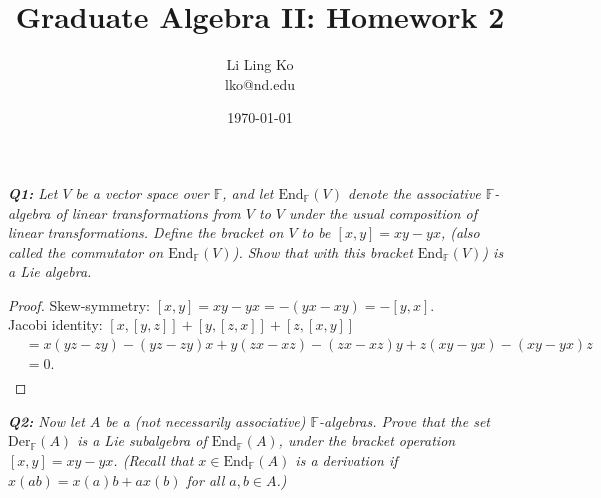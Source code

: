 \documentclass{article}
\begin{document}
\title{Graduate Algebra II: Homework 2}
\author{Li Ling Ko\\ lko@nd.edu}
\date{\today}
\maketitle

\it \textbf{Q1:} Let $V$ be a vector space over $\mathbb{F}$, and let
  $\text{End}_{\mathbb{F}}(V)$ denote the associative $\mathbb{F}$-algebra
  of linear transformations from $V$ to $V$ under the usual composition of
  linear transformations. Define the bracket on $V$ to be $[x,y]=xy-yx$,
  (also called the commutator on $\text{End}_{\mathbb{F}}(V)$). Show that
  with this bracket $\text{End}_{\mathbb{F}}(V)$) is a Lie algebra.

  \begin{proof}
    Skew-symmetry: $[x,y]=xy-yx=-(yx-xy)=-[y,x]$. \\
    Jacobi identity: $[x,[y,z]]+[y,[z,x]]+[z,[x,y]]$
    \begin{align*}
      &=x(yz-zy)-(yz-zy)x +y(zx-xz)-(zx-xz)y +z(xy-yx)-(xy-yx)z\\
      &=0.\\
    \end{align*}
  \end{proof}

\it \textbf{Q2:} Now let $A$ be a (not necessarily associative)
  $\mathbb{F}$-algebras. Prove that the set $\text{Der}_{\mathbb{F}}(A)$ is
  a Lie subalgebra of $\text{End}_{\mathbb{F}}(A)$, under the bracket
  operation $[x,y]=xy-yx$. (Recall that $x\in\text{End}_{\mathbb{F}}(A)$ is
  a derivation if $x(ab)=x(a)b+ax(b)$ for all $a,b\in A$.)
\end{document}
